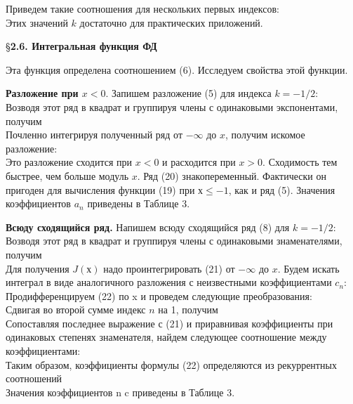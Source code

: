 Приведем такие соотношения для нескольких первых индексов:
\begin{equation}
\end{equation}
Этих значений $k$ достаточно для практических приложений.


\S \textbf{2.6. Интегральная функция ФД}

Эта функция определена соотношением (6). Исследуем свойства этой функции.

\textbf{Разложение при $x < 0.$} Запишем разложение (5) для индекса $k=-1/2$:
\begin{equation}
\end{equation}
Возводя этот ряд в квадрат и группируя члены с одинаковыми экспонентами, получим
\begin{equation}
\end{equation}
Почленно интегрируя полученный ряд от $-\infty$ до $x$, получим искомое
разложение:
\begin{equation}
\end{equation}
Это разложение сходится при $x < 0$ и расходится при $x > 0$. Сходимость тем
быстрее, чем больше модуль $x$. Ряд (20) знакопеременный. Фактически он
пригоден для вычисления функции (19) при $х \leqslant -1$, как и ряд (5). Значения
коэффициентов $a_n$ приведены в Таблице 3.

\textbf{Всюду сходящийся ряд.} Напишем всюду сходящийся ряд (8) для $k = -1/2$:
\begin{equation}
\end{equation}
Возводя этот ряд в квадрат и группируя члены с одинаковыми знаменателями, получим
\begin{equation}
\end{equation}
Для получения $J(х)$ надо проинтегрировать (21) от $-\infty$ до $x$. Будем искать
интеграл в виде аналогичного разложения с неизвестными коэффициентами $c_n$:
\begin{equation}
\end{equation}
Продифференцируем (22) по x и проведем следующие преобразования:
\begin{equation}
\end{equation}
Сдвигая во второй сумме индекс $n$ на 1, получим
\begin{equation}
\end{equation}
Сопоставляя последнее выражение с (21) и приравнивая коэффициенты при
одинаковых степенях знаменателя, найдем следующее соотношение между
коэффициентами:
\begin{equation}
\end{equation}
Таким образом, коэффициенты формулы (22) определяются из рекуррентных соотношений
\begin{equation}
\end{equation}
Значения коэффициентов n c приведены в Таблице 3.

